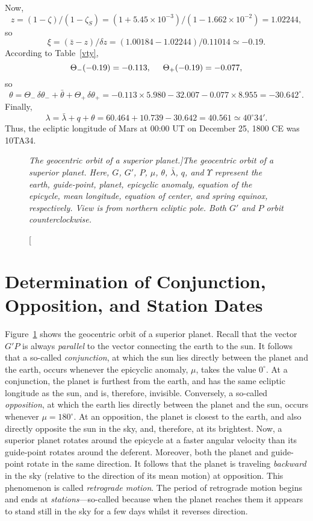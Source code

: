 Now, 
$$
z= (1-\zeta)/(1-\zeta_S) = (1+5.45\times 10^{-3})/(1-1.662\times 10^{-2}) =
1.02244,
$$
so
$$
\xi = (\bar{z}-z)/\delta z = (1.00184-1.02244)/0.11014 \simeq -0.19.
$$ 
According to Table~\ref{vty}, 
$$
\Theta_-(-0.19) = -0.113, \mbox{\hspace{0.5cm}}
\Theta_+(-0.19) = -0.077,
$$
so
$$
\theta  = \Theta_-\,\delta\theta_- + \bar{\theta}+\Theta_+\,\delta\theta_+ = -0.113\times 5.980-32.007-0.077\times 8.955 = -30.642^\circ.
$$
Finally,
$$
\lambda=\bar{\lambda} + q + \theta= 60.464+10.739-30.642 = 40.561 \simeq 40^\circ 34'.
$$ 
Thus,
the ecliptic longitude of Mars at 00:00 UT on December 25, 1800 CE was 10TA34.

\begin{figure}[h]
\epsfysize=3in
\centerline{}
\caption[\em The geocentric orbit of a superior planet.]{\em The geocentric orbit of a superior planet. Here, $G$, $G'$, $P$,  $\mu$,  $\theta$, $\bar{\lambda}$, $q$, and $\Upsilon$ represent
the earth, guide-point, planet,  epicyclic anomaly, equation of the epicycle, mean longitude, equation of center, and spring equinox, respectively. View is
from northern ecliptic pole. Both $G'$ and $P$ orbit counterclockwise.}\label{vf5x}
\end{figure}

\section{Determination of Conjunction, Opposition, and Station Dates}
Figure~\ref{vf5x} shows the geocentric orbit of a superior planet. Recall that the vector $G'P$ is always {\em parallel}\/ to the vector connecting the earth to the sun. It follows that
a so-called {\em conjunction}, at which the sun lies
directly between the planet and the earth, occurs whenever the epicyclic anomaly, $\mu$, takes the value $0^\circ$. At
a conjunction, the planet is furthest from the earth, and has the same ecliptic longitude as the
sun, and is, therefore, invisible. Conversely, a so-called {\em opposition}, at which the earth lies directly between the planet and the sun, occurs whenever $\mu=180^\circ$. At an opposition, the planet is closest to the earth, and also directly opposite the 
sun in the sky, and, therefore, at its brightest. Now, a superior planet rotates around the epicycle at a
faster angular velocity than its guide-point rotates around the deferent. Moreover, both the planet and guide-point rotate
in the same direction. It follows that the planet is traveling {\em backward}\/ in the sky (relative to the direction
of its mean motion) at opposition. This phenomenon is called {\em retrograde motion}. The period of
retrograde motion begins and ends at  {\em stations}---so-called because when the planet reaches them
it appears to stand still in the sky for a few days whilst it reverses direction.

